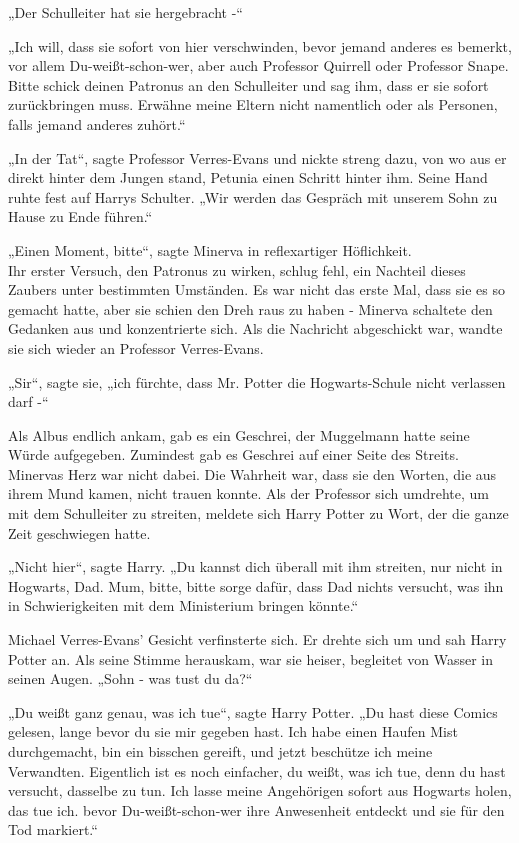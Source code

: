 {„Der Schulleiter hat sie hergebracht -“

„Ich will, dass sie sofort von hier verschwinden, bevor jemand anderes es bemerkt, vor allem Du-weißt-schon-wer, aber auch Professor Quirrell oder Professor Snape. Bitte schick deinen Patronus an den Schulleiter und sag ihm, dass er sie sofort zurückbringen muss. Erwähne meine Eltern nicht namentlich oder als Personen, falls jemand anderes zuhört.“

„In der Tat“, sagte Professor Verres-Evans und nickte streng dazu, von wo aus er direkt hinter dem Jungen stand, Petunia einen Schritt hinter ihm. Seine Hand ruhte fest auf Harrys Schulter. „Wir werden das Gespräch mit unserem Sohn zu Hause zu Ende führen.“

„Einen Moment, bitte“, sagte Minerva in reflexartiger Höflichkeit.\\ Ihr erster Versuch, den Patronus zu wirken, schlug fehl, ein Nachteil dieses Zaubers unter bestimmten Umständen. Es war nicht das erste Mal, dass sie es so gemacht hatte, aber sie schien den Dreh raus zu haben - Minerva schaltete den Gedanken aus und konzentrierte sich. Als die Nachricht abgeschickt war, wandte sie sich wieder an Professor Verres-Evans.

„Sir“, sagte sie, „ich fürchte, dass Mr. Potter die Hogwarts-Schule nicht verlassen darf -“

Als Albus endlich ankam, gab es ein Geschrei, der Muggelmann hatte seine Würde aufgegeben. Zumindest gab es Geschrei auf einer Seite des Streits. Minervas Herz war nicht dabei. Die Wahrheit war, dass sie den Worten, die aus ihrem Mund kamen, nicht trauen konnte. Als der Professor sich umdrehte, um mit dem Schulleiter zu streiten, meldete sich Harry Potter zu Wort, der die ganze Zeit geschwiegen hatte.

„Nicht hier“, sagte Harry. „Du kannst dich überall mit ihm streiten, nur nicht in Hogwarts, Dad. Mum, bitte, bitte sorge dafür, dass Dad nichts versucht, was ihn in Schwierigkeiten mit dem Ministerium bringen könnte.“

Michael Verres-Evans' Gesicht verfinsterte sich. Er drehte sich um und sah Harry Potter an. Als seine Stimme herauskam, war sie heiser, begleitet von Wasser in seinen Augen. „Sohn - was tust du da?“

„Du weißt ganz genau, was ich tue“, sagte Harry Potter. „Du hast diese Comics gelesen, lange bevor du sie mir gegeben hast. Ich habe einen Haufen Mist durchgemacht, bin ein bisschen gereift, und jetzt beschütze ich meine Verwandten. Eigentlich ist es noch einfacher, du weißt, was ich tue, denn du hast versucht, dasselbe zu tun. Ich lasse meine Angehörigen sofort aus Hogwarts holen, das tue ich. bevor Du-weißt-schon-wer ihre Anwesenheit entdeckt und sie für den Tod markiert.“

}

